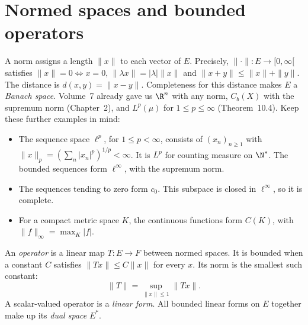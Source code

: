 \section{Normed spaces and bounded operators}

A norm assigns a length $\|x\|$ to each vector of $E$. Precisely, $\|\cdot\|:E\to[0,\infty[$ satisfies $\|x\|=0\iff x=0$, $\|\lambda x\|=|\lambda|\|x\|$ and $\|x+y\|\le\|x\|+\|y\|$. The distance is $d(x,y)=\|x-y\|$. Completeness for this distance makes $E$ a \emph{Banach space}. Volume~7 already gave us $\R^n$ with any norm, $C_b(X)$ with the supremum norm (Chapter~2), and $L^p(\mu)$ for $1\le p\le\infty$ (Theorem~10.4). Keep these further examples in mind:
\begin{itemize}
\item The sequence space $\ell^p$, for $1\le p<\infty$, consists of $(x_n)_{n\ge1}$ with $\|x\|_p=(\sum_n|x_n|^p)^{1/p}<\infty$. It is $L^p$ for counting measure on $\N^*$. The bounded sequences form $\ell^\infty$, with the supremum norm.
\item The sequences tending to zero form $c_0$. This subspace is closed in $\ell^\infty$, so it is complete.
\item For a compact metric space $K$, the continuous functions form $C(K)$, with $\|f\|_\infty=\max_K|f|$.
\end{itemize}

An \emph{operator} is a linear map $T:E\to F$ between normed spaces. It is bounded when a constant $C$ satisfies $\|Tx\|\le C\|x\|$ for every $x$. Its norm is the smallest such constant:
\[\|T\|=\sup_{\|x\|\le1}\|Tx\|.\]
A scalar-valued operator is a \emph{linear form}. All bounded linear forms on $E$ together make up its \emph{dual space} $E^*$.

